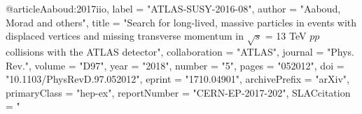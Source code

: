 @article{Aaboud:2017iio,
      label          = "ATLAS-SUSY-2016-08",
      author         = "Aaboud, Morad and others",
      title          = "{Search for long-lived, massive particles in events with
                        displaced vertices and missing transverse momentum in
                        $\sqrt{s}$ = 13 TeV $pp$ collisions with the ATLAS
                        detector}",
      collaboration  = "ATLAS",
      journal        = "Phys. Rev.",
      volume         = "D97",
      year           = "2018",
      number         = "5",
      pages          = "052012",
      doi            = "10.1103/PhysRevD.97.052012",
      eprint         = "1710.04901",
      archivePrefix  = "arXiv",
      primaryClass   = "hep-ex",
      reportNumber   = "CERN-EP-2017-202",
      SLACcitation   = "%
}

